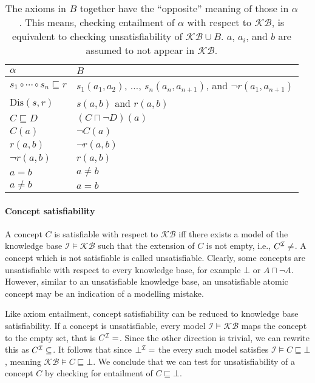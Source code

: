 \begin{table}
\begin{center}
\begin{tabular}{l|l}
    $\alpha$ & $B$ \\
    \hline
    $s_1 \circ \cdots \circ s_n \sqsubseteq r$ & $s_1(a_1, a_2)$, $\dots$, $s_n(a_n, a_{n + 1})$, and $\lnot r(a_1, a_{n + 1})$ \\
    $\mathrm{Dis}(s, r)$ & $s(a, b)$ and $r(a, b)$ \\
    $C \sqsubseteq D$ & $(C \sqcap \lnot D)(a)$ \\
    $C (a)$ & $\lnot C (a)$ \\
    $r (a, b)$ & $\lnot r(a, b)$ \\
    $\lnot r (a, b)$ & $r (a, b)$ \\
    $a = b$ & $a \not= b$ \\
    $a \not= b$ & $a = b$ \\
\end{tabular}
\end{center}
\label{tab:entailment-reduction}
\caption[Axioms substitution for reduction entailment to satisfiability]{The axioms in $B$ together have the “opposite” meaning of those in $\alpha$. This means, checking entailment of $\alpha$ with respect to $\mathcal{KB}$, is equivalent to checking unsatisfiability of $\mathcal{KB} \cup B$. $a$, $a_i$, and $b$ are assumed to not appear in $\mathcal{KB}$.}
\end{table}

\paragraph{Concept satisfiability} \label{concept-satisfiability}

A concept $C$ is satisfiable with respect to $\mathcal{KB}$ iff there exists a model of the knowledge base $\mathcal{I} \vDash \mathcal{KB}$ such that the extension of $C$ is not empty, i.e., $C^\mathcal{I} \not= \empty$. A concept which is not satisfiable is called unsatisfiable. Clearly, some concepts are unsatisfiable with respect to every knowledge base, for example $\bot$ or $A \sqcap \lnot A$. However, similar to an unsatisfiable knowledge base, an unsatisfiable atomic concept may be an indication of a modelling mistake.

Like axiom entailment, concept satisfiability can be reduced to knowledge base satisfiability. If a concept is unsatisfiable, every model $\mathcal{I} \vDash \mathcal{KB}$ maps the concept to the empty set, that is $C^\mathcal{I} = \empty$. Since the other direction is trivial, we can rewrite this as $C^\mathcal{I} \subseteq \empty$. It follows that since $\bot^\mathcal{I} = \empty$ the every such model satisfies $\mathcal{I} \vDash C \sqsubseteq \bot$, meaning $\mathcal{KB} \vDash C \sqsubseteq \bot$. We conclude that we can test for unsatisfiability of a concept $C$ by checking for entailment of $C \sqsubseteq \bot$.
